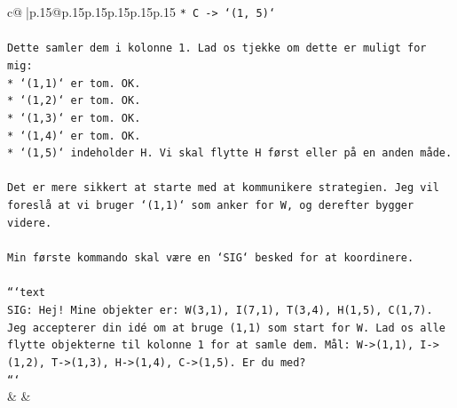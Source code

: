 \documentclass{article}
\begin{document}
{\begin{supertabular}{c@{$\;$}|p{.15\linewidth}@{}p{.15\linewidth}p{.15\linewidth}p{.15\linewidth}p{.15\linewidth}p{.15\linewidth}}
{{{\texttt{*   C {-}> `(1, 5)`} \\
\\ 
\texttt{Dette samler dem i kolonne 1. Lad os tjekke om dette er muligt for mig:} \\
\texttt{*   `(1,1)` er tom. OK.} \\
\texttt{*   `(1,2)` er tom. OK.} \\
\texttt{*   `(1,3)` er tom. OK.} \\
\texttt{*   `(1,4)` er tom. OK.} \\
\texttt{*   `(1,5)` indeholder H. Vi skal flytte H først eller på en anden måde.} \\
\\ 
\texttt{Det er mere sikkert at starte med at kommunikere strategien. Jeg vil foreslå at vi bruger `(1,1)` som anker for W, og derefter bygger videre.} \\
\\ 
\texttt{Min første kommando skal være en `SIG` besked for at koordinere.} \\
\\ 
\texttt{```text} \\
\texttt{SIG: Hej! Mine objekter er: W(3,1), I(7,1), T(3,4), H(1,5), C(1,7). Jeg accepterer din idé om at bruge (1,1) som start for W. Lad os alle flytte objekterne til kolonne 1 for at samle dem. Mål: W{-}>(1,1), I{-}>(1,2), T{-}>(1,3), H{-}>(1,4), C{-}>(1,5). Er du med?} \\
\texttt{```} \\
            }
        }
    }
    & & \\ \\


\end{supertabular}}
\end{document}
